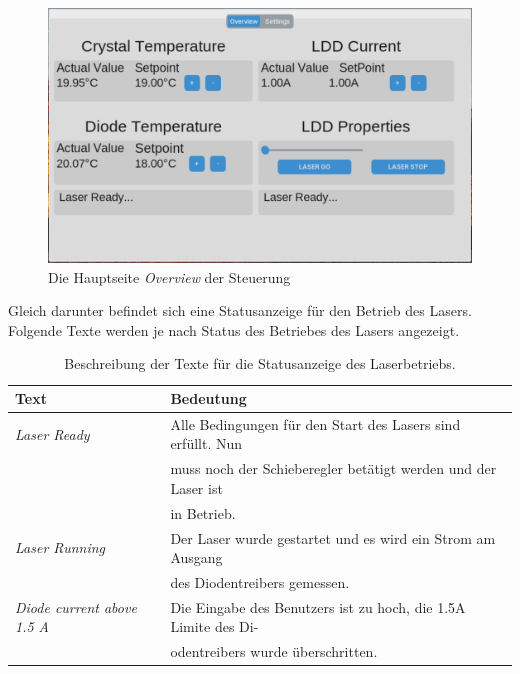 \begin{figure}[H]
    \centering
    \includegraphics[scale=0.3, trim={1mm 1mm 1mm 1mm}, clip]{98_images/window_overview_large_02.PNG}
    \caption{Die Hauptseite \textit{Overview} der Steuerung}
    \label{fig:overview_sw}
\end{figure}

Gleich darunter befindet sich eine Statusanzeige für den Betrieb des Lasers. Folgende Texte werden je nach Status des Betriebes des Lasers angezeigt.

\begin{table}[H]
    \centering
    \begin{tabular}{l|l}
        \textbf{Text}&                          \textbf{Bedeutung}\\
        \hline
         \textit{Laser Ready}&                  Alle Bedingungen für den Start des Lasers sind erfüllt. Nun\\
         &                                      muss noch der Schieberegler betätigt werden und der Laser ist\\
         &                                      in Betrieb.\\
         \textit{Laser Running}&                Der Laser wurde gestartet und es wird ein Strom am Ausgang\\
         &                                      des Diodentreibers gemessen.\\
         \textit{Diode current above 1.5 A}&    Die Eingabe des Benutzers ist zu hoch, die 1.5A Limite des Di-\\
         &                                      odentreibers wurde überschritten.                                
    \end{tabular}
    \caption{Beschreibung der Texte für die Statusanzeige des Laserbetriebs.}
    \label{tab:my_label}
\end{table}

